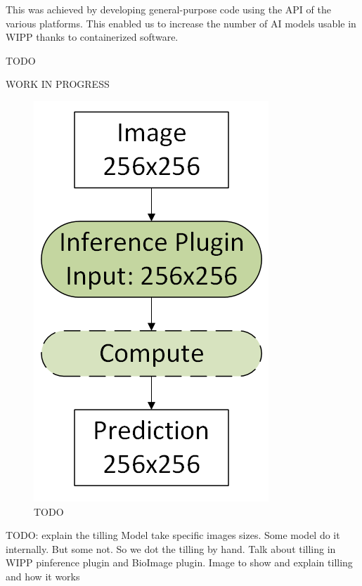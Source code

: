 This was achieved by developing general-purpose code using the API of
the various platforms. This
enabled us to increase the number of AI models usable
in WIPP thanks to containerized software.


TODO

WORK IN PROGRESS

\begin{figure}[H]
  \centering
  \includegraphics[width=0.40\linewidth]{png/methods/no_tiling.png}
  \caption{TODO}
\end{figure}

TODO: explain the tilling
Model take specific images sizes.
Some model do it internally.
But some not.
So we dot the tilling by hand.
Talk about tilling in WIPP pinference plugin and BioImage plugin.
Image to show and explain tilling and how it works

